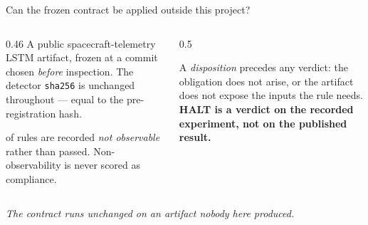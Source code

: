 \documentclass[aspectratio=169,11pt]{beamer}
\newcommand{\msg}[1]{%
  \vfill\vspace{0.2em}%
  \begin{center}\begin{minipage}{0.92\textwidth}\centering
  \small\itshape\color{black!70}#1
  \end{minipage}\end{center}}
\begin{document}
\begin{frame}{Can the frozen contract be applied outside this project?}
  \vspace{-0.2em}
  \begin{columns}[T,onlytextwidth]
    \begin{column}{0.46\textwidth}
      \small A public spacecraft-telemetry LSTM artifact, frozen at a commit chosen
      \emph{before} inspection. The detector \texttt{sha256} is unchanged throughout ---
      equal to the pre-registration hash.

      \vspace{0.8em}
      {\scriptsize \Nextnobs{} of \Nextrules{} rules are recorded \emph{not observable} rather
      than passed. Non-observability is never scored as compliance.}
    \end{column}
    \begin{column}{0.5\textwidth}
      \centering
      \vspace{0.9em}

      \begin{minipage}{\linewidth}\raggedright\scriptsize
      A \emph{disposition} precedes any verdict: the obligation does not arise, or the artifact
      does not expose the inputs the rule needs. \textbf{\Nexthalt{} HALT is a verdict on the
      recorded experiment, not on the published result.}
      \end{minipage}
    \end{column}
  \end{columns}
  \msg{The contract runs unchanged on an artifact nobody here produced.}
\end{frame}
\end{document}
